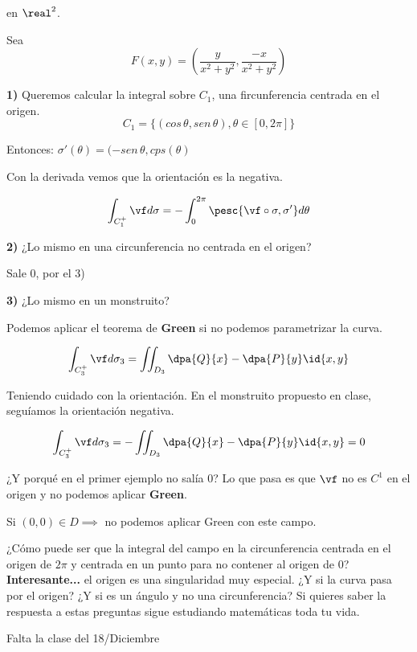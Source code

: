 \begin{example}
en $\real^2$.

Sea \[F(x,y) = \left(\frac{y}{x^2+y^2}, \frac{-x}{x^2+y^2}\right)\]

\textbf{1)}
Queremos calcular la integral sobre $C_1$, una fircunferencia centrada en el origen.
\[C_1 = \{(cos\,\theta,sen\,\theta),\theta\in[0,2\pi]\}\]

Entonces: $\sigma'(\theta) = (-sen\,\theta,cps(\theta)$

Con la derivada vemos que la orientación es la negativa.

\[\int_{C_1^+} \vf d\sigma = -\int_0^{2\pi} \pesc{\vf\circ\sigma,\sigma'}d\theta\]

\textbf{2)}
¿Lo mismo en una circunferencia no centrada en el origen?

Sale $0$, por el 3)

\textbf{3)}
¿Lo mismo en un monstruito?

Podemos aplicar el teorema de \textbf{Green} si no podemos parametrizar la curva.

\[\int_{C_3^+} \vf d\sigma_3 = \iint_{D_3} \dpa{Q}{x} - \dpa{P}{y} \id{x,y}\]

Teniendo cuidado con la orientación. En el monstruito propuesto en clase, seguíamos la orientación negativa.

\[\int_{C_3^+} \vf d\sigma_3 =  - \iint_{D_3} \dpa{Q}{x} - \dpa{P}{y} \id{x,y} = 0\]


\obs
¿Y porqué en el primer ejemplo no salía 0? Lo que pasa es que $\vf$ no es $C^1$ en el origen y no podemos aplicar \textbf{Green}.

Si $(0,0)\in D \implies $ no podemos aplicar Green con este campo.

¿Cómo puede ser que la integral del campo en la circunferencia centrada en el origen de $2\pi$ y centrada en un punto para no contener al origen de $0$?  \textbf{Interesante...} el origen es una singularidad muy especial. ¿Y si la curva pasa por el origen? ¿Y si es un ángulo y no una circunferencia? Si quieres saber la respuesta a estas preguntas sigue estudiando matemáticas toda tu vida.

\end{example}

Falta la clase del 18/Diciembre

